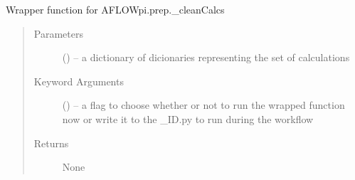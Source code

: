 \documentclass[letterpaper,10pt,english]{sphinxmanual}
\begin{document}

\begin{fulllineitems}
\label{\detokenize{prep:prep.cleanCalcs}}
Wrapper function for AFLOWpi.prep.\_cleanCalcs
\begin{quote}\begin{description}
\item[{Parameters}] \leavevmode
{} () -- a dictionary of dicionaries representing the set of calculations

\item[{Keyword Arguments}] \leavevmode
{} () -- a flag to choose whether or not to run the wrapped function now
or write it to the \_ID.py to run during the workflow

\item[{Returns}] \leavevmode
None

\end{description}\end{quote}

\end{fulllineitems}


\begin{fulllineitems}
\label{\detokenize{prep:prep.construct_and_run}}
\end{fulllineitems}

\end{document}
